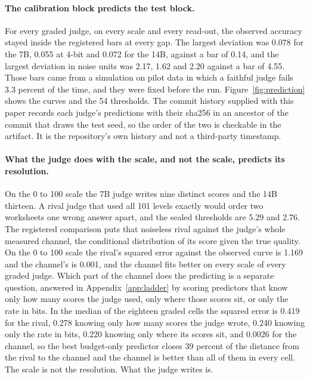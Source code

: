 \documentclass{article}
\theoremstyle{definition}
\theoremstyle{remark}
\begin{document}
\paragraph{The calibration block predicts the test block.}
For every graded judge, on every scale and every read-out, the observed accuracy stayed inside the registered bars at every gap.
The largest deviation was 0.078 for the 7B, 0.055 at 4-bit and 0.072 for the 14B, against a bar of 0.14, and the largest deviation in noise units was 2.17, 1.62 and 2.20 against a bar of 4.55.
Those bars came from a simulation on pilot data in which a faithful judge fails 3.3 percent of the time, and they were fixed before the run.
Figure~\ref{fig:prediction} shows the curves and the 54 thresholds.
The commit history supplied with this paper records each judge's predictions with their sha256 in an ancestor of the commit that draws the test seed, so the order of the two is checkable in the artifact. It is the repository's own history and not a third-party timestamp.

\paragraph{What the judge does with the scale, and not the scale, predicts its resolution.}
On the 0 to 100 scale the 7B judge writes nine distinct scores and the 14B thirteen.
A rival judge that used all 101 levels exactly would order two worksheets one wrong answer apart, and the sealed thresholds are 5.29 and 2.76.
The registered comparison puts that noiseless rival against the judge's whole measured channel, the conditional distribution of its score given the true quality. On the 0 to 100 scale the rival's squared error against the observed curve is 1.169 and the channel's is 0.001, and the channel fits better on every scale of every graded judge. Which part of the channel does the predicting is a separate question, answered in Appendix~\ref{app:ladder} by scoring predictors that know only how many scores the judge used, only where those scores sit, or only the rate in bits. In the median of the eighteen graded cells the squared error is 0.419 for the rival, 0.278 knowing only how many scores the judge wrote, 0.240 knowing only the rate in bits, 0.220 knowing only where its scores sit, and 0.0026 for the channel, so the best budget-only predictor closes 39 percent of the distance from the rival to the channel and the channel is better than all of them in every cell.
The scale is not the resolution. What the judge writes is.
\end{document}
